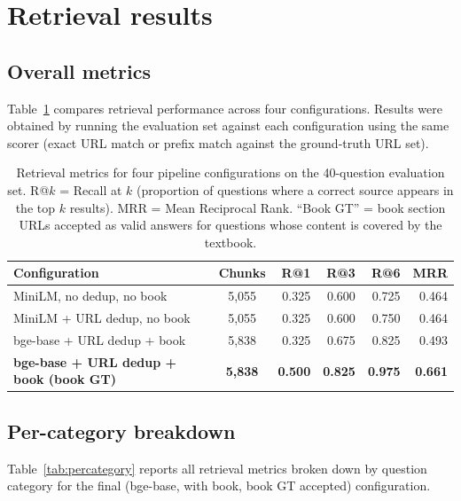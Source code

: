 \documentclass[12pt,a4paper]{article}
\begin{document}
\section{Retrieval results}
\label{sec:results}

\subsection{Overall metrics}
\label{sec:overall}

Table~\ref{tab:configs} compares retrieval performance across four
configurations.
Results were obtained by running the evaluation set against each
configuration using the same scorer (exact URL match or prefix match
against the ground-truth URL set).

\begin{table}[htbp]
  \centering
  \caption{Retrieval metrics for four pipeline configurations on the
           40-question evaluation set.
           R@$k$ = Recall at $k$ (proportion of questions where a correct
           source appears in the top $k$ results).
           MRR = Mean Reciprocal Rank.
           ``Book GT'' = book section URLs accepted as valid answers for
           questions whose content is covered by the textbook.}
  \label{tab:configs}
  \begin{tabular}{lcrrrr}
    \toprule
    Configuration & Chunks & R@1 & R@3 & R@6 & MRR \\
    \midrule
    MiniLM, no dedup, no book         & 5{,}055 & 0.325 & 0.600 & 0.725 & 0.464 \\
    MiniLM + URL dedup, no book       & 5{,}055 & 0.325 & 0.600 & 0.750 & 0.464 \\
    bge-base + URL dedup + book       & 5{,}838 & 0.325 & 0.675 & 0.825 & 0.493 \\
    \textbf{bge-base + URL dedup + book (book GT)} & \textbf{5{,}838} & \textbf{0.500} & \textbf{0.825} & \textbf{0.975} & \textbf{0.661} \\
    \bottomrule
  \end{tabular}
\end{table}

\subsection{Per-category breakdown}
\label{sec:percategory}

Table~\ref{tab:percategory} reports all retrieval metrics broken down by
question category for the final (bge-base, with book, book GT accepted)
configuration.
\end{document}
